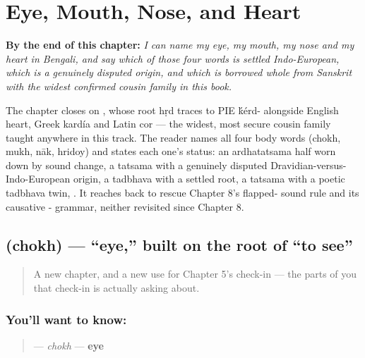 
\chapter{Eye, Mouth, Nose, and Heart}
\label{ch:bn-eye-mouth-nose-heart}

\begin{chapteropening}
\textbf{By the end of this chapter:} \emph{I can name my eye, my mouth, my nose and my heart in Bengali, and say which of those four words is settled Indo-European, which is a genuinely disputed origin, and which is borrowed whole from Sanskrit with the widest confirmed cousin family in this book.}

The chapter closes on , whose root hṛd traces to PIE \'{k}érd- alongside English heart, Greek kardía and Latin cor — the widest, most secure cousin family taught anywhere in this track. The reader names all four body words (chokh, mukh, nāk, hridoy) and states each one's status:  an ardhatatsama half worn down by sound change,  a tatsama with a genuinely disputed Dravidian-versus-Indo-European origin,  a tadbhava with a settled root,  a tatsama with a poetic tadbhava twin, . It reaches back to rescue Chapter 8's flapped- sound rule and its causative - grammar, neither revisited since Chapter 8.
\end{chapteropening}

\section[chokh]{ (chokh) — \textquotedblleft{}eye,\textquotedblright{} built on the root of \textquotedblleft{}to see\textquotedblright{}}

\label{lesson:BN-C12-chokh}



\begin{quote}
A new chapter, and a new use for Chapter 5's check-in — the parts of you that check-in is actually asking about.
\end{quote}

\subsection*{You'll want to know: }
\begin{quote}
\textbf{} — \emph{chokh} — \textbf{eye}
\end{quote}


